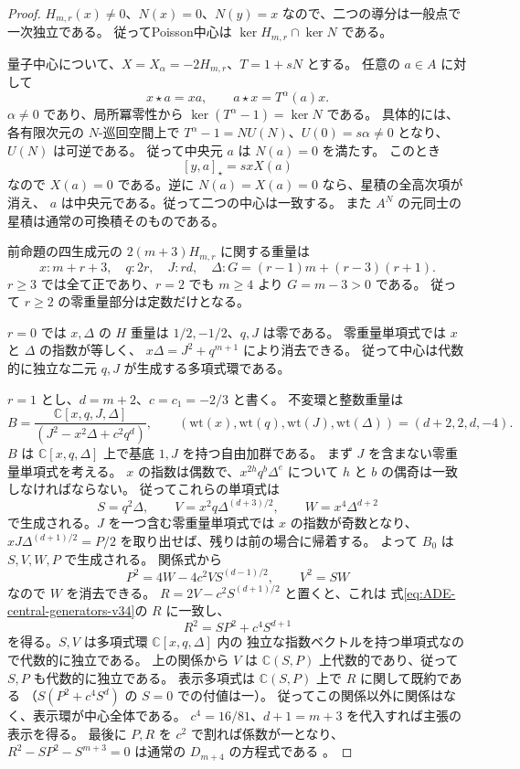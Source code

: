 \begin{proof}
$H_{m,r}(x)\ne0$、$N(x)=0$、$N(y)=x$ なので、二つの導分は一般点で一次独立である。
従ってPoisson中心は $\ker H_{m,r}\cap\ker N$ である。

量子中心について、$X=X_\alpha=-2H_{m,r}$、$T=1+sN$ とする。
任意の $a\in A$ に対して
\[
 x\star a=xa,\qquad a\star x=T^\alpha(a)x.
\]
$\alpha\ne0$ であり、局所冪零性から
$\ker(T^\alpha-1)=\ker N$ である。
具体的には、各有限次元の $N$-巡回空間上で
$T^\alpha-1=N U(N)$、$U(0)=s\alpha\ne0$ となり、$U(N)$ は可逆である。
従って中央元 $a$ は $N(a)=0$ を満たす。
このとき
\[
 [y,a]_\star=sxX(a)
\]
なので $X(a)=0$ である。逆に $N(a)=X(a)=0$ なら、星積の全高次項が消え、
$a$ は中央元である。従って二つの中心は一致する。
また $A^N$ の元同士の星積は通常の可換積そのものである。

前命題の四生成元の $2(m+3)H_{m,r}$ に関する重量は
\[
 x:m+r+3,\quad q:2r,\quad J:rd,\quad
 \Delta:G=(r-1)m+(r-3)(r+1).
\]
$r\ge3$ では全て正であり、$r=2$ でも $m\ge4$ より $G=m-3>0$ である。
従って $r\ge2$ の零重量部分は定数だけとなる。

$r=0$ では $x,\Delta$ の $H$ 重量は $1/2,-1/2$、$q,J$ は零である。
零重量単項式では $x$ と $\Delta$ の指数が等しく、
$x\Delta=J^2+q^{m+1}$ により消去できる。
従って中心は代数的に独立な二元 $q,J$ が生成する多項式環である。

$r=1$ とし、$d=m+2$、$c=c_1=-2/3$ と書く。
不変環と整数重量は
\[
 B=\frac{\mathbb C[x,q,J,\Delta]}{(J^2-x^2\Delta+c^2q^d)},\qquad
 (\mathrm{wt}(x),\mathrm{wt}(q),\mathrm{wt}(J),\mathrm{wt}(\Delta))
 =(d+2,2,d,-4).
\]
$B$ は $\mathbb C[x,q,\Delta]$ 上で基底 $1,J$ を持つ自由加群である。
まず $J$ を含まない零重量単項式を考える。
$x$ の指数は偶数で、$x^{2h}q^b\Delta^e$ について
$h$ と $b$ の偶奇は一致しなければならない。
従ってこれらの単項式は
\[
 S=q^2\Delta,\qquad
 V=x^2q\Delta^{(d+3)/2},\qquad
 W=x^4\Delta^{d+2}
\]
で生成される。$J$ を一つ含む零重量単項式では $x$ の指数が奇数となり、
$xJ\Delta^{(d+1)/2}=P/2$ を取り出せば、残りは前の場合に帰着する。
よって $B_0$ は $S,V,W,P$ で生成される。
関係式から
\[
 P^2=4W-4c^2VS^{(d-1)/2},\qquad V^2=SW
\]
なので $W$ を消去できる。
$R=2V-c^2S^{(d+1)/2}$ と置くと、これは
式\eqref{eq:ADE-central-generators-v34}の $R$ に一致し、
\[
 R^2=SP^2+c^4S^{d+1}
\]
を得る。$S,V$ は多項式環 $\mathbb C[x,q,\Delta]$ 内の
独立な指数ベクトルを持つ単項式なので代数的に独立である。
上の関係から $V$ は $\mathbb C(S,P)$ 上代数的であり、従って $S,P$ も代数的に独立である。
表示多項式は
$\mathbb C(S,P)$ 上で $R$ に関して既約である
（$S(P^2+c^4S^d)$ の $S=0$ での付値は一）。
従ってこの関係以外に関係はなく、表示環が中心全体である。
$c^4=16/81$、$d+1=m+3$ を代入すれば主張の表示を得る。
最後に $P,R$ を $c^2$ で割れば係数が一となり、
$R^2-SP^2-S^{m+3}=0$ は通常の $D_{m+4}$ の方程式である
\cite[Table 1]{ReidDuVal}。
\end{proof}

